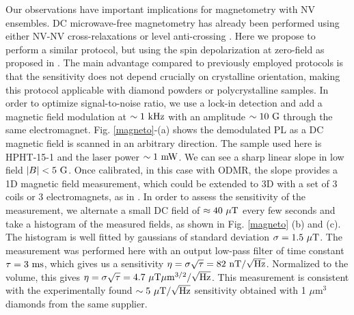 \documentclass[preprintnumbers,amsmath,amssymb,superscriptaddress,twocolumn,showpacs]{revtex4-2}
\begin{document}
Our observations have important implications for magnetometry with NV ensembles.
DC microwave-free magnetometry has already been performed using either NV-NV cross-relaxations \citep{akhmedzhanov_microwave-free_2017,akhmedzhanov_magnetometry_2019} or level anti-crossing \citep{Wickenbrock, zheng2017level, zheng_microwave-free_2020}. Here we propose to perform a similar protocol, but using the spin depolarization at zero-field as proposed in \cite{filimonenko2018weak, filimonenko2022manifestation}. The main advantage compared to previously employed protocols is that the sensitivity does not depend crucially on crystalline orientation, making this protocol applicable with diamond powders or polycrystalline samples. In order to optimize signal-to-noise ratio, we use a lock-in detection and add a magnetic field modulation at $\sim 1\ \rm kHz$ with an amplitude $\sim 10\ \rm G$ through the same electromagnet. Fig. \ref{magneto}-(a) shows the demodulated PL as a DC magnetic field is scanned in an arbitrary direction. The sample used here is HPHT-15-1 and the laser power $\sim 1\ \rm mW$.  We can see a sharp linear slope in low field $\abs{B} < 5\ \rm G$. Once calibrated, in this case with ODMR, the slope provides a 1D magnetic field measurement, which could be extended to 3D with a set of 3 coils or 3 electromagnets, as in \cite{zheng_microwave-free_2020}. In order to assess the sensitivity of the measurement, we alternate a small DC field of $\approx 40\ \mu\rm{T}$ every few seconds and take a histogram of the measured fields, as shown in Fig. \ref{magneto} (b) and (c). The histogram is well fitted by gaussians of standard deviation $\sigma=1.5\ \mu \rm T$. The measurement was performed here with an output low-pass filter of time constant $\tau=3\ \rm ms$, which gives us a sensitivity $\eta=\sigma \sqrt{\tau}=82\ \rm{nT}/\sqrt{\rm Hz}$. Normalized to the volume, this gives $\eta=\sigma \sqrt{\tau}=4.7 \ \mu \rm{T}\mu m^{3/2}/\sqrt{\rm Hz}$. This measurement is consistent with the experimentally found $\sim 5\ \mu \rm{T}/\sqrt{\rm Hz}$ sensitivity obtained with 1 $\mu$m$^3$ diamonds from the same supplier.
\end{document}
